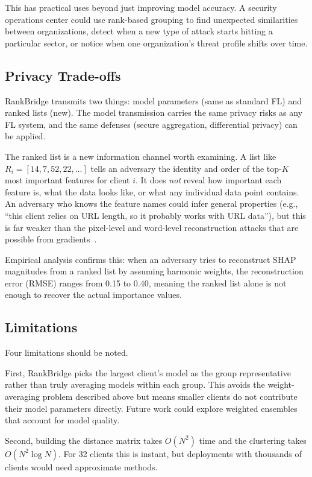 \documentclass[information,article,submit,pdftex]{mdpi}
\begin{document}
This has practical uses beyond just improving model accuracy. A security
operations center could use rank-based grouping to find unexpected similarities
between organizations, detect when a new type of attack starts hitting a
particular sector, or notice when one organization's threat profile shifts over
time.

\subsection{Privacy Trade-offs}

RankBridge transmits two things: model parameters (same as standard FL) and ranked
lists (new). The model transmission carries the same privacy risks as any FL
system, and the same defenses (secure aggregation, differential privacy) can be
applied.

The ranked list is a new information channel worth examining. A list like
$R_i = [14, 7, 52, 22, \ldots]$ tells an adversary the identity and order of the
top-$K$ most important features for client $i$. It does \textit{not} reveal how
important each feature is, what the data looks like, or what any individual data
point contains. An adversary who knows the feature names could infer general
properties (e.g., ``this client relies on URL length, so it probably works with
URL data''), but this is far weaker than the pixel-level and word-level
reconstruction attacks that are possible from
gradients~\cite{zhu2019deepleakage}.

Empirical analysis confirms this: when an adversary tries to reconstruct SHAP
magnitudes from a ranked list by assuming harmonic weights, the reconstruction
error (RMSE) ranges from 0.15 to 0.40, meaning the ranked list alone is not
enough to recover the actual importance values.

\subsection{Limitations}

Four limitations should be noted.

First, RankBridge picks the largest client's model as the group representative
rather than truly averaging models within each group. This avoids the
weight-averaging problem described above but means smaller clients do not
contribute their model parameters directly. Future work could explore weighted
ensembles that account for model quality.

Second, building the distance matrix takes $O(N^2)$ time and the clustering takes
$O(N^2 \log N)$. For 32 clients this is instant, but deployments with thousands
of clients would need approximate methods.
\end{document}
